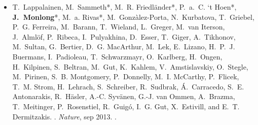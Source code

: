 \begin{itemize}
\item T.~Lappalainen, M.~Sammeth*, M.~R. Friedl{\"{a}}nder*, P.~a.~C. {‘t Hoen}*,
  {\bf J.~Monlong}*, M.~a. Rivas*, M.~Gonz{\`{a}}lez-Porta, N.~Kurbatova, T.~Griebel,
  P.~G. Ferreira, M.~Barann, T.~Wieland, L.~Greger, M.~van Iterson,
  J.~Alml{\"{o}}f, P.~Ribeca, I.~Pulyakhina, D.~Esser, T.~Giger, A.~Tikhonov,
  M.~Sultan, G.~Bertier, D.~G. MacArthur, M.~Lek, E.~Lizano, H.~P.~J. Buermans,
  I.~Padioleau, T.~Schwarzmayr, O.~Karlberg, H.~Ongen, H.~Kilpinen, S.~Beltran,
  M.~Gut, K.~Kahlem, V.~Amstislavskiy, O.~Stegle, M.~Pirinen, S.~B. Montgomery,
  P.~Donnelly, M.~I. McCarthy, P.~Flicek, T.~M. Strom, H.~Lehrach,
  S.~Schreiber, R.~Sudbrak, {\'{A}}.~Carracedo, S.~E. Antonarakis,
  R.~H{\"{a}}sler, A.-C. Syv{\"{a}}nen, G.-J. van Ommen, A.~Brazma,
  T.~Meitinger, P.~Rosenstiel, R.~Guig{\'{o}}, I.~G. Gut, X.~Estivill, and
  E.~T. Dermitzakis.
.
\newblock \emph{Nature}, sep 2013.
\newblock {}.
\end{itemize}



